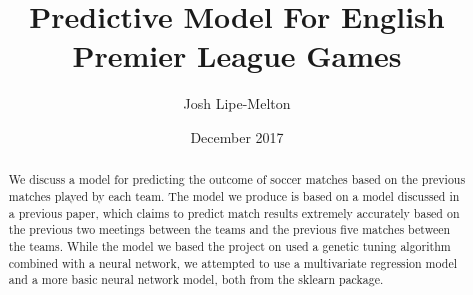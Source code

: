 \documentclass[sigconf]{acmart}
\title{Predictive Model For English Premier League Games}
\author{Josh Lipe-Melton}
\date{December 2017}
\begin{document}
\maketitle

\begin{abstract}
We discuss a model for predicting the outcome of soccer matches based on the previous matches played by each team. The model we produce is based on a model discussed in a previous paper, which claims to predict match results extremely accurately based on the previous two meetings between the teams and the previous five matches between the teams. While the model we based the project on used a genetic tuning algorithm combined with a neural network, we attempted to use a multivariate regression model and a more basic neural network model, both from the sklearn package.
\end{abstract}
\end{document}
